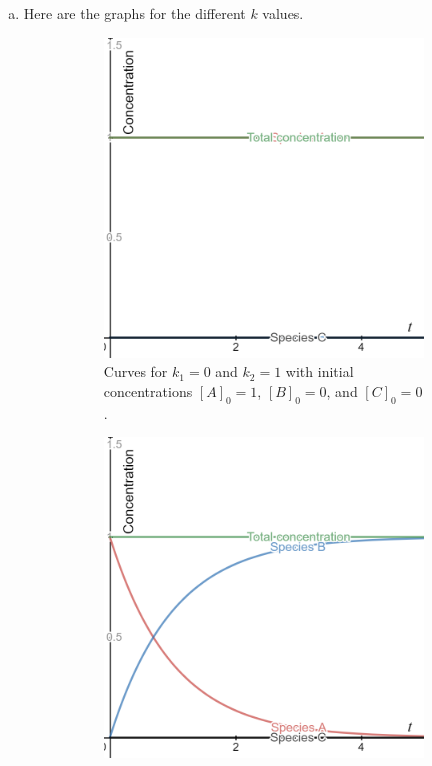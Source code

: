 \documentclass[12pt]{article} %
\begin{document}
\begin{solution}
\begin{enumerate}[(a)]
    \item Here are the graphs for the different $k$ values.
    \begin{figure}[H]
        \centering
        \begin{subfigure}[b]{0.3\textwidth}
            \centering
            \includegraphics[width=\textwidth]{k10k21.png}
            \caption{Curves for $k_1=0$ and $k_2=1$ with initial concentrations $[A]_0=1$, $[B]_0=0$, and $[C]_0=0$. }
        \end{subfigure}
        \hspace*{2cm}
        \begin{subfigure}[b]{0.3\textwidth}
            \centering
            \includegraphics[width=\textwidth]{k11k20.png}

\end{subfigure}
\end{figure}
\end{enumerate}
\end{solution}
\end{document}
